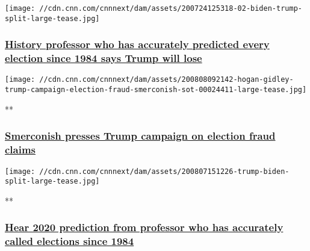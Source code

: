 \href{/2020/08/07/us/allan-lichtman-trump-biden-2020-trnd/index.html}{}

\texttt{[image: //cdn.cnn.com/cnnnext/dam/assets/200724125318-02-biden-trump-split-large-tease.jpg]}

\hypertarget{history-professor-who-has-accurately-predicted-every-election-since-1984-says-trump-will-lose}{%
\subsubsection{\texorpdfstring{\href{/2020/08/07/us/allan-lichtman-trump-biden-2020-trnd/index.html}{History
professor who has accurately predicted every election since 1984 says
Trump will
lose}}{History professor who has accurately predicted every election since 1984 says Trump will lose}}\label{history-professor-who-has-accurately-predicted-every-election-since-1984-says-trump-will-lose}}

\href{/videos/politics/2020/08/08/hogan-gidley-trump-campaign-election-fraud-smerconish-sot.cnn}{}

\texttt{[image: //cdn.cnn.com/cnnnext/dam/assets/200808092142-hogan-gidley-trump-campaign-election-fraud-smerconish-sot-00024411-large-tease.jpg]}

**

\hypertarget{smerconish-presses-trump-campaign-on-election-fraud-claims-}{%
\subsubsection{\texorpdfstring{\href{/videos/politics/2020/08/08/hogan-gidley-trump-campaign-election-fraud-smerconish-sot.cnn}{Smerconish
presses Trump campaign on election fraud claims
}}{Smerconish presses Trump campaign on election fraud claims }}\label{smerconish-presses-trump-campaign-on-election-fraud-claims-}}

\href{/videos/politics/2020/08/08/allan-lichtman-2020-predicts-trump-loses-to-biden-smerconish-sot.cnn}{}

\texttt{[image: //cdn.cnn.com/cnnnext/dam/assets/200807151226-trump-biden-split-large-tease.jpg]}

**

\hypertarget{hear-2020-prediction-from-professor-who-has-accurately-called-elections-since-1984}{%
\subsubsection{\texorpdfstring{\href{/videos/politics/2020/08/08/allan-lichtman-2020-predicts-trump-loses-to-biden-smerconish-sot.cnn}{Hear
2020 prediction from professor who has accurately called elections since
1984}}{Hear 2020 prediction from professor who has accurately called elections since 1984}}\label{hear-2020-prediction-from-professor-who-has-accurately-called-elections-since-1984}}


